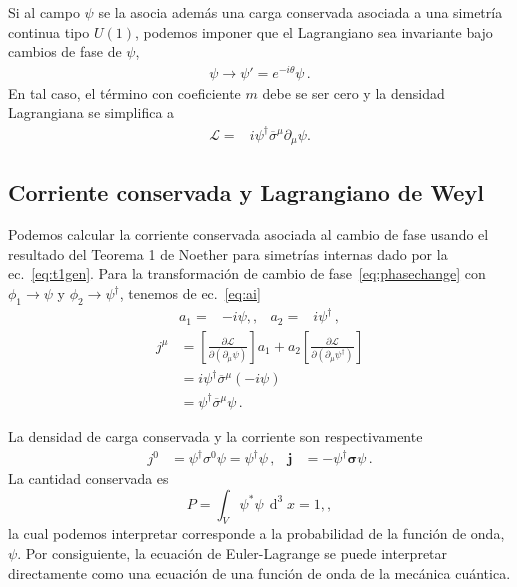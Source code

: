 \begin{frame}
Si al campo $\psi$ se la asocia además una carga conservada asociada a una simetría continua tipo $U(1)$, podemos imponer que el Lagrangiano sea invariante bajo cambios de fase de $\psi$, 
\begin{align}
  \label{eq:phasechange}
  \psi\to \psi'=e^{-i\theta}\psi\,.
\end{align}
En tal caso, el término con coeficiente $m$ debe se ser cero y la densidad Lagrangiana se simplifica a
\begin{align}
  \label{eq:masslesweylL}
   \mathcal{L}=&i{\psi}^{\dagger}\overline{\sigma}^\mu\partial_\mu\psi.
\end{align}
\end{frame}


\subsection{Corriente conservada y Lagrangiano de Weyl}
\label{sec:corriente-conservada}
\begin{frame}
  Podemos calcular la corriente conservada asociada al cambio de fase
  usando el resultado del Teorema 1 de Noether para simetrías internas  dado por la ec.~\eqref{eq:t1gen}. Para la transformación de cambio de fase~\eqref{eq:phasechange} con $\phi_1\to \psi$ y $\phi_2\to \psi^{\dagger}$, tenemos de ec.~\eqref{eq:ai}
  \begin{align}
    a_{1}=&-i\psi,,&      a_{2}=&i\psi^{\dagger}\,,
  \end{align}
\begin{align}
   j^\mu&=\left[\frac{\partial\mathcal{L}}{\partial\left(\partial_\mu\psi\right)}\right]a_1+a_2\left[\frac{\partial\mathcal{L}}{\partial\left(\partial_\mu\psi^\dagger\right)}\right]\nonumber\\
   &= i\psi^\dagger \overline{\sigma}^\mu(-i\psi)\nonumber\\
   &=\psi^\dagger \overline{\sigma}^\mu\psi\,.
\end{align}

La  densidad de carga conservada y la corriente son respectivamente
\begin{align}
  j^0&= \psi^\dagger \sigma^0\psi=\psi^{\dagger}\psi\,,&
  \boldsymbol{j}&=-\psi^{\dagger}\boldsymbol{\sigma} \psi\,.
\end{align}
La cantidad conservada es
\begin{equation}
  \label{eq:57}
P=  \int_V \psi^*\psi \,\operatorname{d}^3x=1,,
\end{equation}
la cual podemos interpretar corresponde a la probabilidad de la funci\'on de onda, $\psi$. Por consiguiente, la ecuación de Euler-Lagrange se puede interpretar directamente como una ecuación de una función de onda de la mecánica cuántica. 
\end{frame}
